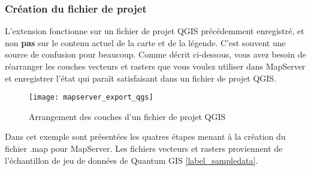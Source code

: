 \subsubsection{Cr\'eation du fichier de projet}

L'extension fonctionne sur un fichier de projet QGIS pr\'ec\'edemment enregistr\'e, et non \textbf{pas} sur le contenu actuel de la carte et de la l\'egende. C'est souvent une source de confusion pour beaucoup. Comme d\'ecrit ci-dessous, vous avez besoin de r\'earranger les couches vecteurs et rasters que vous voulez utiliser dans MapServer et enregistrer l'\'etat qui para\^it satisfaisant dans un fichier de projet QGIS.


\begin{figure}[ht]
\begin{center}
  \caption{Arrangement des couches d'un fichier de projet QGIS \nixcaption}
  \label{fig:mapserver_export_qgs}\smallskip
  \texttt{[image: mapserver\_export\_qgs]}
\end{center}
\end{figure}


Dans cet exemple sont pr\'esent\'ees les quatres \'etapes menant \`a la cr\'eation du fichier .map pour MapServer. Les fichiers vecteurs et rasters proviennent de l'\'echantillon de jeu de donn\'ees de Quantum GIS \ref{label_sampledata}.


